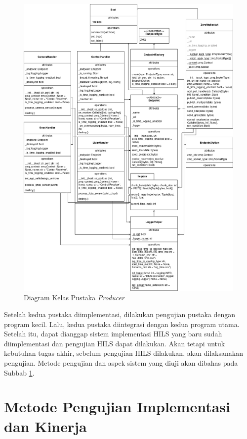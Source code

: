 \begin{figure}[!htbp]
	\centering
	\includegraphics[width=1.0\textwidth]{resources/chapter-4/producer-class_diagram.png}
	\caption{Diagram Kelas Pustaka \textit{Producer}}
	\label{chapter-4-producer-class-diagram}
\end{figure}

Setelah kedua pustaka diimplementasi, dilakukan pengujian pustaka dengan program
kecil. Lalu, kedua pustaka diintegrasi dengan kedua program utama. Setelah itu,
dapat dianggap sistem implementasi HILS yang baru sudah diimplementasi dan
pengujian HILS dapat dilakukan. Akan tetapi untuk kebutuhan tugas akhir, sebelum
pengujian HILS dilakukan, akan dilaksanakan pengujian. Metode pengujian dan
aspek sistem yang diuji akan dibahas pada Subbab
\ref{chapter-4-testing-methodology}.

\section{Metode Pengujian Implementasi dan
  Kinerja}\label{chapter-4-testing-methodology}

